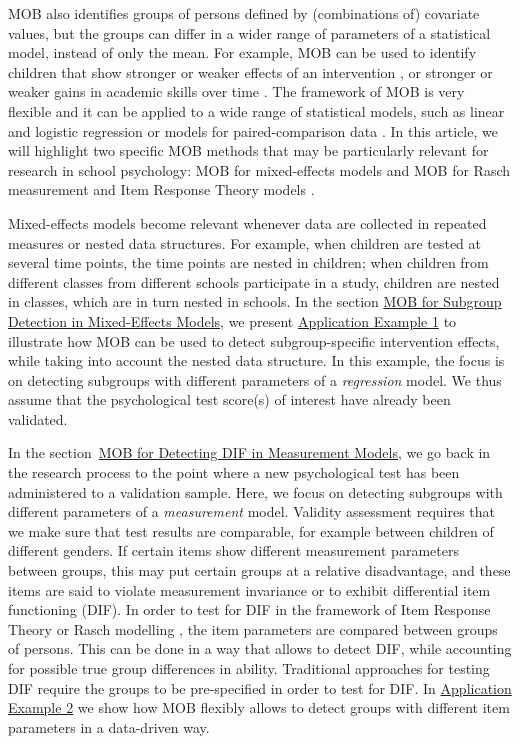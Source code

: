 \documentclass[doc,floatsintext,natbib]{apa7}
\begin{document}
MOB also identifies groups of persons defined by (combinations of) covariate values, but the groups can differ in a wider range of parameters of a statistical model, instead of only the mean. For example, MOB can be used to identify children that show stronger or weaker effects of an intervention \citep{ChunyAnso21}, or stronger or weaker gains in academic skills over time \citep{FokkyZeil24}. The framework of MOB is very flexible and it can be applied to a wide range of statistical models, such as %
linear and logistic regression \citep{KopAugStr:2013,ZeilyHoth08} or models for paired-comparison data \citep{StrWicZei:2011:JoEaBS,WiedyFrick21}. In this article, we will highlight two specific MOB methods that may be particularly relevant for research in school psychology: MOB for mixed-effects models \citep{FokkySmit18} and MOB for Rasch measurement and Item Response Theory models \citep[IRT,][]{StrKopZei:2015:P,KomStrZei:2017:EaPM,HenDebStr:2023:EPM}. 

Mixed-effects models become relevant whenever data are collected in repeated measures or nested data structures. For example, when children are tested at several time points, the time points are nested in children; when children from different classes from different schools participate in a study, children are nested in classes, which are in turn nested in schools. In the section \hyperref[sec:glmmtree]{MOB for Subgroup Detection in Mixed-Effects Models}, we present \hyperref[sec:TutorialMixed]{Application Example 1} to illustrate how MOB can be used to detect subgroup-specific intervention effects, while taking into account the nested data structure. In this example, the focus is on detecting subgroups with different parameters of a \textit{regression} model. We thus assume that the psychological test score(s) of interest have already been validated. 

In the section~\hyperref[sec:raschtree]{MOB for Detecting DIF in Measurement Models}, we go back in the research process to the point where a new psychological test has been administered to a validation sample. Here, we focus on detecting subgroups with different parameters of a \textit{measurement} model. Validity assessment requires that we make sure that test results are comparable, for example between children of different genders. If certain items show different measurement parameters between groups, this may put certain groups at a relative disadvantage, and these items are said to violate measurement invariance or to exhibit differential item functioning (DIF). In order to test for DIF in the framework of Item Response Theory or Rasch modelling \citep{AnthyDiPe16,DebStrZei:2022:CRC,Mall97}, the item parameters are compared between groups of persons. This can be done in a way that allows to detect DIF, while accounting for possible true group differences in ability. Traditional approaches for testing DIF require the groups to be pre-specified in order to test for DIF. In \hyperref[sec:TutorialRasch]{Application Example 2} we show how MOB flexibly allows to detect groups with different item parameters in a data-driven way. 
\end{document}
